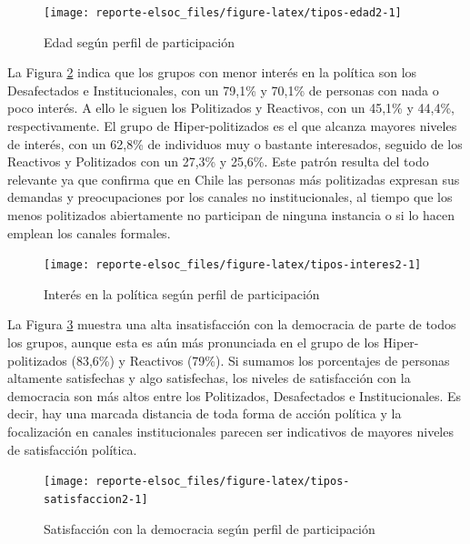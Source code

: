 \documentclass[
  12pt,
]{book}
\begin{document}
\begin{figure}

{\centering \texttt{[image: reporte-elsoc\_files/figure-latex/tipos-edad2-1]} 

}

\caption{Edad según perfil de participación}\label{fig:tipos-edad2}
\end{figure}

La Figura \ref{fig:tipos-interes2} indica que los grupos con menor interés en la política son los Desafectados e Institucionales, con un 79,1\% y 70,1\% de personas con nada o poco interés. A ello le siguen los Politizados y Reactivos, con un 45,1\% y 44,4\%, respectivamente. El grupo de Hiper-politizados es el que alcanza mayores niveles de interés, con un 62,8\% de individuos muy o bastante interesados, seguido de los Reactivos y Politizados con un 27,3\% y 25,6\%. Este patrón resulta del todo relevante ya que confirma que en Chile las personas más politizadas expresan sus demandas y preocupaciones por los canales no institucionales, al tiempo que los menos politizados abiertamente no participan de ninguna instancia o si lo hacen emplean los canales formales.

\begin{figure}

{\centering \texttt{[image: reporte-elsoc\_files/figure-latex/tipos-interes2-1]} 

}

\caption{Interés en la política según perfil de participación}\label{fig:tipos-interes2}
\end{figure}

La Figura \ref{fig:tipos-satisfaccion2} muestra una alta insatisfacción con la democracia de parte de todos los grupos, aunque esta es aún más pronunciada en el grupo de los Hiper-politizados (83,6\%) y Reactivos (79\%). Si sumamos los porcentajes de personas altamente satisfechas y algo satisfechas, los niveles de satisfacción con la democracia son más altos entre los Politizados, Desafectados e Institucionales. Es decir, hay una marcada distancia de toda forma de acción política y la focalización en canales institucionales parecen ser indicativos de mayores niveles de satisfacción política.

\begin{figure}

{\centering \texttt{[image: reporte-elsoc\_files/figure-latex/tipos-satisfaccion2-1]} 

}

\caption{Satisfacción con la democracia según perfil de participación}\label{fig:tipos-satisfaccion2}
\end{figure}
\end{document}

